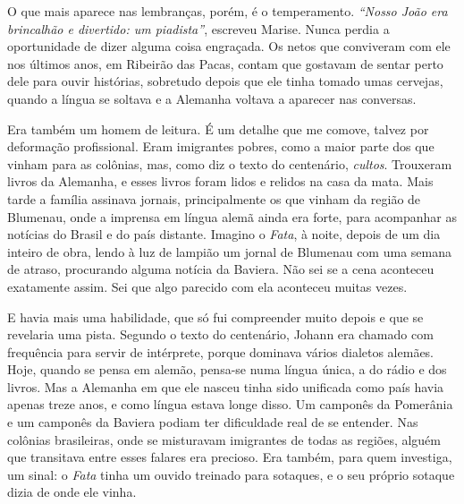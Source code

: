 \documentclass[
  brazilian,
  11pt,
  openany]{book}
\begin{document}
O que mais aparece nas lembranças, porém, é o temperamento.
\emph{``Nosso João era brincalhão e divertido: um piadista''}, escreveu
Marise. Nunca perdia a oportunidade de dizer alguma coisa engraçada. Os
netos que conviveram com ele nos últimos anos, em Ribeirão das Pacas,
contam que gostavam de sentar perto dele para ouvir histórias, sobretudo
depois que ele tinha tomado umas cervejas, quando a língua se soltava e
a Alemanha voltava a aparecer nas conversas.

Era também um homem de leitura. É um detalhe que me comove, talvez por
deformação profissional. Eram imigrantes pobres, como a maior parte dos
que vinham para as colônias, mas, como diz o texto do centenário,
\emph{cultos}. Trouxeram livros da Alemanha, e esses livros foram lidos
e relidos na casa da mata. Mais tarde a família assinava jornais,
principalmente os que vinham da região de Blumenau, onde a imprensa em
língua alemã ainda era forte, para acompanhar as notícias do Brasil e do
país distante. Imagino o \emph{Fata}, à noite, depois de um dia inteiro
de obra, lendo à luz de lampião um jornal de Blumenau com uma semana de
atraso, procurando alguma notícia da Baviera. Não sei se a cena
aconteceu exatamente assim. Sei que algo parecido com ela aconteceu
muitas vezes.

E havia mais uma habilidade, que só fui compreender muito depois e que
se revelaria uma pista. Segundo o texto do centenário, Johann era
chamado com frequência para servir de intérprete, porque dominava vários
dialetos alemães. Hoje, quando se pensa em alemão, pensa-se numa língua
única, a do rádio e dos livros. Mas a Alemanha em que ele nasceu tinha
sido unificada como país havia apenas treze anos, e como língua estava
longe disso. Um camponês da Pomerânia e um camponês da Baviera podiam
ter dificuldade real de se entender. Nas colônias brasileiras, onde se
misturavam imigrantes de todas as regiões, alguém que transitava entre
esses falares era precioso. Era também, para quem investiga, um sinal: o
\emph{Fata} tinha um ouvido treinado para sotaques, e o seu próprio
sotaque dizia de onde ele vinha.
\end{document}
